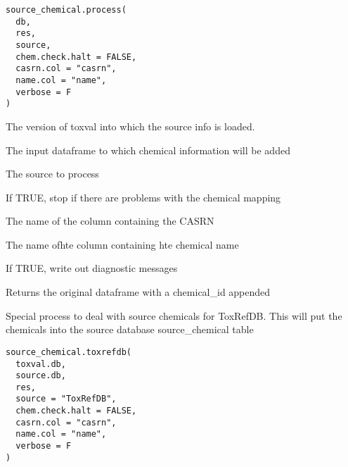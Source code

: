 \documentclass[letterpaper]{book}
\begin{document}
%
\begin{Usage}
\begin{verbatim}
source_chemical.process(
  db,
  res,
  source,
  chem.check.halt = FALSE,
  casrn.col = "casrn",
  name.col = "name",
  verbose = F
)
\end{verbatim}
\end{Usage}
%
\begin{Arguments}
\begin{ldescription}
\item[\code{db}] The version of toxval into which the source info is loaded.

\item[\code{res}] The input dataframe to which chemical information will be added

\item[\code{source}] The source to process

\item[\code{chem.check.halt}] If TRUE, stop if there are problems with the chemical mapping

\item[\code{casrn.col}] The name of the column containing the CASRN

\item[\code{name.col}] The name ofhte column containing hte chemical name

\item[\code{verbose}] If TRUE, write out diagnostic messages
\end{ldescription}
\end{Arguments}
%
\begin{Value}
Returns the original dataframe with a chemical\_id appended
\end{Value}
%
\begin{Description}\relax
Special process to deal with source chemicals for ToxRefDB. This will put the
chemicals into the source database source\_chemical table
\end{Description}
%
\begin{Usage}
\begin{verbatim}
source_chemical.toxrefdb(
  toxval.db,
  source.db,
  res,
  source = "ToxRefDB",
  chem.check.halt = FALSE,
  casrn.col = "casrn",
  name.col = "name",
  verbose = F
)
\end{verbatim}
\end{Usage}
\end{document}
